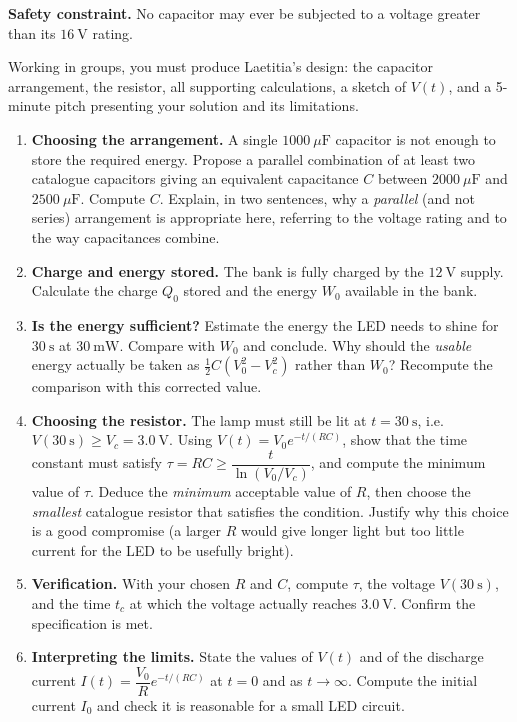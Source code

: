 \documentclass[11pt]{article}
\newcounter{popsec}
\newcounter{popsub}
\newcommand{\courssub}[1]{%
  \stepcounter{popsub}%
  \par\vspace{9pt}\noindent{\popxbold\fontsize{11.5}{13}\selectfont\color{popink}{\color{poporange}\thepopsec.\thepopsub}\hspace{6pt}#1}\par\nopagebreak\vspace{4pt}
}
\begin{document}
\begin{exemplebox}
\textbf{Safety constraint.} No capacitor may ever be subjected to a voltage greater than its $16\ \mathrm{V}$ rating.

Working in groups, you must produce Laetitia's design: the capacitor arrangement, the resistor, all supporting calculations, a sketch of $V(t)$, and a 5-minute pitch presenting your solution and its limitations.
\end{exemplebox}

\courssub{Tasks}

\begin{enumerate}
\item \textbf{Choosing the arrangement.} A single $1000\ \mu\mathrm{F}$ capacitor is not enough to store the required energy. Propose a parallel combination of at least two catalogue capacitors giving an equivalent capacitance $C$ between $2000\ \mu\mathrm{F}$ and $2500\ \mu\mathrm{F}$. Compute $C$. Explain, in two sentences, why a \emph{parallel} (and not series) arrangement is appropriate here, referring to the voltage rating and to the way capacitances combine.
\item \textbf{Charge and energy stored.} The bank is fully charged by the $12\ \mathrm{V}$ supply. Calculate the charge $Q_{0}$ stored and the energy $W_{0}$ available in the bank.
\item \textbf{Is the energy sufficient?} Estimate the energy the LED needs to shine for $30\ \mathrm{s}$ at $30\ \mathrm{mW}$. Compare with $W_{0}$ and conclude. Why should the \emph{usable} energy actually be taken as $\tfrac{1}{2}C\left(V_{0}^{2} - V_{c}^{2}\right)$ rather than $W_{0}$? Recompute the comparison with this corrected value.
\item \textbf{Choosing the resistor.} The lamp must still be lit at $t = 30\ \mathrm{s}$, i.e. $V(30\ \mathrm{s}) \geq V_{c} = 3.0\ \mathrm{V}$. Using $V(t) = V_{0}e^{-t/(RC)}$, show that the time constant must satisfy $\tau = RC \geq \dfrac{t}{\ln(V_{0}/V_{c})}$, and compute the minimum value of $\tau$. Deduce the \emph{minimum} acceptable value of $R$, then choose the \emph{smallest} catalogue resistor that satisfies the condition. Justify why this choice is a good compromise (a larger $R$ would give longer light but too little current for the LED to be usefully bright).
\item \textbf{Verification.} With your chosen $R$ and $C$, compute $\tau$, the voltage $V(30\ \mathrm{s})$, and the time $t_{c}$ at which the voltage actually reaches $3.0\ \mathrm{V}$. Confirm the specification is met.
\item \textbf{Interpreting the limits.} State the values of $V(t)$ and of the discharge current $I(t) = \dfrac{V_{0}}{R}e^{-t/(RC)}$ at $t = 0$ and as $t \to \infty$. Compute the initial current $I_{0}$ and check it is reasonable for a small LED circuit.

\end{enumerate}
\end{document}
